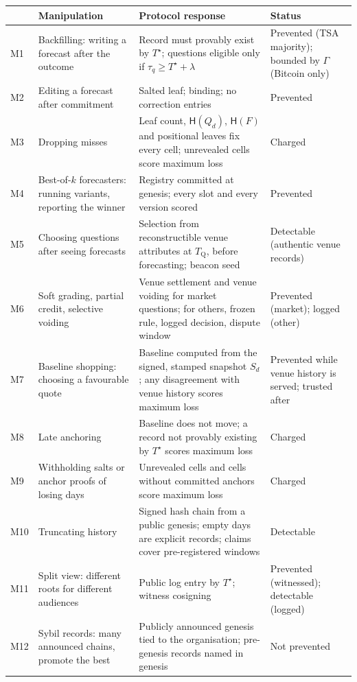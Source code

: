 \documentclass[11pt]{article}
\newcommand{\Hh}{\mathsf{H}}
\newcommand{\Ts}{T^{\star}}
\newcommand{\tQ}{T_{\mathrm{Q}}}
\begin{document}
\begin{table}[t]
\centering
\small
\begin{tabularx}{\textwidth}{@{}l>{\raggedright\arraybackslash}X>{\raggedright\arraybackslash}X>{\raggedright\arraybackslash}p{2.4cm}@{}}
\toprule
 & Manipulation & Protocol response & Status \\
\midrule
M1 & Backfilling: writing a forecast after the outcome & Record must provably exist by $\Ts$; questions eligible only if $\tau_q \ge \Ts + \lambda$ & Prevented (TSA majority); bounded by $\Gamma$ (Bitcoin only) \\
M2 & Editing a forecast after commitment & Salted leaf; binding; no correction entries & Prevented \\
M3 & Dropping misses & Leaf count, $\Hh(Q_d)$, $\Hh(F)$ and positional leaves fix every cell; unrevealed cells score maximum loss & Charged \\
M4 & Best-of-$k$ forecasters: running variants, reporting the winner & Registry committed at genesis; every slot and every version scored & Prevented \\
M5 & Choosing questions after seeing forecasts & Selection from reconstructible venue attributes at $\tQ$, before forecasting; beacon seed & Detectable (authentic venue records) \\
M6 & Soft grading, partial credit, selective voiding & Venue settlement and venue voiding for market questions; for others, frozen rule, logged decision, dispute window & Prevented (market); logged (other) \\
M7 & Baseline shopping: choosing a favourable quote & Baseline computed from the signed, stamped snapshot $S_d$; any disagreement with venue history scores maximum loss & Prevented while venue history is served; trusted after \\
M8 & Late anchoring & Baseline does not move; a record not provably existing by $\Ts$ scores maximum loss & Charged \\
M9 & Withholding salts or anchor proofs of losing days & Unrevealed cells and cells without committed anchors score maximum loss & Charged \\
M10 & Truncating history & Signed hash chain from a public genesis; empty days are explicit records; claims cover pre-registered windows & Detectable \\
M11 & Split view: different roots for different audiences & Public log entry by $\Ts$; witness cosigning & Prevented (witnessed); detectable (logged) \\
M12 & Sybil records: many announced chains, promote the best & Publicly announced genesis tied to the organisation; pre-genesis records named in genesis & Not prevented \\

\end{tabularx}
\end{table}
\end{document}
